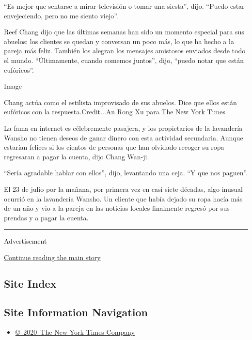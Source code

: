``Es mejor que sentarse a mirar televisión o tomar una siesta'', dijo.
``Puedo estar envejeciendo, pero no me siento viejo''.

Reef Chang dijo que las últimas semanas han sido un momento especial
para sus abuelos: los clientes se quedan y conversan un poco más, lo que
ha hecho a la pareja más feliz. También los alegran los mensajes
amistosos enviados desde todo el mundo. ``Últimamente, cuando comemos
juntos'', dijo, ``puedo notar que están eufóricos''.

Image

Chang actúa como el estilista improvisado de sus abuelos. Dice que ellos
están eufóricos con la respuesta.Credit...An Rong Xu para The New York
Times

La fama en internet es célebremente pasajera, y los propietarios de la
lavandería Wansho no tienen deseos de ganar dinero con esta actividad
secundaria. Aunque estarían felices si los cientos de personas que han
olvidado recoger su ropa regresaran a pagar la cuenta, dijo Chang
Wan-ji.

``Sería agradable hablar con ellos'', dijo, levantando una ceja. ``Y que
nos paguen''.

El 23 de julio por la mañana, por primera vez en casi siete décadas,
algo inusual ocurrió en la lavandería Wansho. Un cliente que había
dejado su ropa hacía más de un año y vio a la pareja en las noticias
locales finalmente regresó por sus prendas y a pagar la cuenta.

\begin{center}\rule{0.5\linewidth}{\linethickness}\end{center}

Advertisement

\protect\hyperlink{after-bottom}{Continue reading the main story}

\hypertarget{site-index}{%
\subsection{Site Index}\label{site-index}}

\hypertarget{site-information-navigation}{%
\subsection{Site Information
Navigation}\label{site-information-navigation}}

\begin{itemize}
\tightlist
\item
  \href{https://help.nytimes.com/hc/en-us/articles/115014792127-Copyright-notice}{©~2020~The
  New York Times Company}
\end{itemize}

